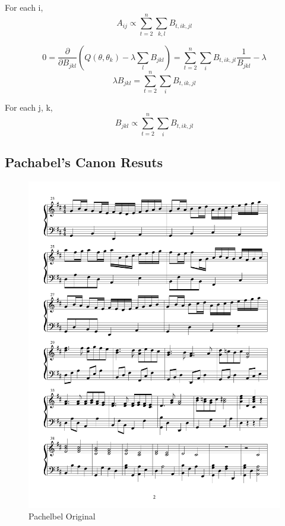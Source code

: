 \documentclass{article} %
\begin{document}
For each i, $$A_{ij} \propto \sum_{t=2}^n \sum_{k,l} B_{t,ik,jl}$$ \newline

$$ 0 = \frac{\partial}{\partial B_{jkl}} (Q(\theta, \theta_k) - \lambda \sum_l B_{jkl}) = \sum_{t=2}^n \sum_i B_{t,ik,jl} \frac{1}{B_{jkl}} - \lambda$$
$$ \lambda B_{jkl} = \sum_{t=2}^n \sum_i B_{t,ik,jl}$$

For each j, k, \newline
$$B_{jkl} \propto \sum_{t=2}^n \sum_i B_{t,ik,jl}$$

\subsection{Pachabel's Canon Resuts}

\begin{figure}[H]
\centering

\includegraphics [scale = 0.6] {PachelbelOriginal-cropped.pdf}
\caption{Pachelbel Original\label{Porig}}
\end{figure}
\end{document}
